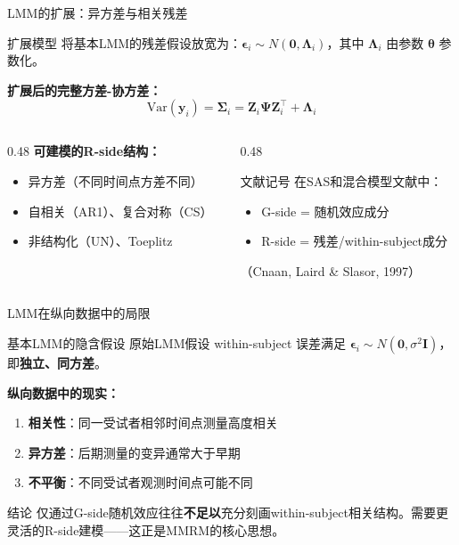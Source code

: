 \documentclass[aspectratio=169,11pt]{beamer}
\newcommand{\by}{\mathbf{y}}
\newcommand{\bZ}{\mathbf{Z}}
\newcommand{\btheta}{\boldsymbol{\theta}}
\newcommand{\bepsilon}{\boldsymbol{\epsilon}}
\newcommand{\bSigma}{\boldsymbol{\Sigma}}
\newcommand{\bPsi}{\boldsymbol{\Psi}}
\newcommand{\bLambda}{\boldsymbol{\Lambda}}
\newcommand{\bI}{\mathbf{I}}
\newcommand{\Var}{\mathrm{Var}}
\begin{document}
\begin{frame}{LMM的扩展：异方差与相关残差}
\begin{block}{扩展模型}
将基本LMM的残差假设放宽为：$\bepsilon_i \sim N(\mathbf{0}, \bLambda_i)$，其中 $\bLambda_i$ 由参数 $\btheta$ 参数化。
\end{block}

\textbf{扩展后的完整方差-协方差：}\vspace{-0.2cm}
\[
\Var(\by_i) = \bSigma_i = \bZ_i \bPsi \bZ_i^\top + \bLambda_i
\]

\vspace{-0.1cm}
\begin{columns}[T,totalwidth=\textwidth]
\begin{column}{0.48\textwidth}
\textbf{可建模的R-side结构：}
\begin{itemize}
    \item 异方差（不同时间点方差不同）
    \item 自相关（AR1）、复合对称（CS）
    \item 非结构化（UN）、Toeplitz
\end{itemize}
\end{column}
\begin{column}{0.48\textwidth}
\begin{exampleblock}{文献记号}
在SAS和混合模型文献中：
\begin{itemize}
    \item G-side = 随机效应成分
    \item R-side = 残差/within-subject成分
\end{itemize}
（Cnaan, Laird \& Slasor, 1997）
\end{exampleblock}
\end{column}
\end{columns}
\end{frame}

\begin{frame}{LMM在纵向数据中的局限}
\begin{block}{基本LMM的隐含假设}
原始LMM假设 within-subject 误差满足 $\bepsilon_i \sim N(\mathbf{0}, \sigma^2 \bI)$，即\textbf{独立、同方差}。
\end{block}

\vspace{0.2cm}
\textbf{纵向数据中的现实：}
\begin{enumerate}
    \item \textbf{相关性}：同一受试者相邻时间点测量高度相关
    \item \textbf{异方差}：后期测量的变异通常大于早期
    \item \textbf{不平衡}：不同受试者观测时间点可能不同
\end{enumerate}

\vspace{0.2cm}
\begin{alertblock}{结论}
仅通过G-side随机效应往往\textbf{不足以}充分刻画within-subject相关结构。需要更灵活的R-side建模——这正是MMRM的核心思想。
\end{alertblock}
\end{frame}
\end{document}
